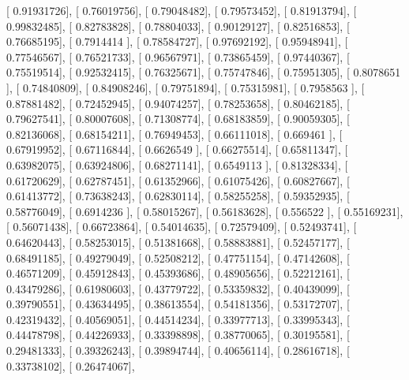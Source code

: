 \documentclass{article}
\begin{document}
       [ 0.91931726],
       [ 0.76019756],
       [ 0.79048482],
       [ 0.79573452],
       [ 0.81913794],
       [ 0.99832485],
       [ 0.82783828],
       [ 0.78804033],
       [ 0.90129127],
       [ 0.82516853],
       [ 0.76685195],
       [ 0.7914414 ],
       [ 0.78584727],
       [ 0.97692192],
       [ 0.95948941],
       [ 0.77546567],
       [ 0.76521733],
       [ 0.96567971],
       [ 0.73865459],
       [ 0.97440367],
       [ 0.75519514],
       [ 0.92532415],
       [ 0.76325671],
       [ 0.75747846],
       [ 0.75951305],
       [ 0.8078651 ],
       [ 0.74840809],
       [ 0.84908246],
       [ 0.79751894],
       [ 0.75315981],
       [ 0.7958563 ],
       [ 0.87881482],
       [ 0.72452945],
       [ 0.94074257],
       [ 0.78253658],
       [ 0.80462185],
       [ 0.79627541],
       [ 0.80007608],
       [ 0.71308774],
       [ 0.68183859],
       [ 0.90059305],
       [ 0.82136068],
       [ 0.68154211],
       [ 0.76949453],
       [ 0.66111018],
       [ 0.669461  ],
       [ 0.67919952],
       [ 0.67116844],
       [ 0.6626549 ],
       [ 0.66275514],
       [ 0.65811347],
       [ 0.63982075],
       [ 0.63924806],
       [ 0.68271141],
       [ 0.6549113 ],
       [ 0.81328334],
       [ 0.61720629],
       [ 0.62787451],
       [ 0.61352966],
       [ 0.61075426],
       [ 0.60827667],
       [ 0.61413772],
       [ 0.73638243],
       [ 0.62830114],
       [ 0.58255258],
       [ 0.59352935],
       [ 0.58776049],
       [ 0.6914236 ],
       [ 0.58015267],
       [ 0.56183628],
       [ 0.556522  ],
       [ 0.55169231],
       [ 0.56071438],
       [ 0.66723864],
       [ 0.54014635],
       [ 0.72579409],
       [ 0.52493741],
       [ 0.64620443],
       [ 0.58253015],
       [ 0.51381668],
       [ 0.58883881],
       [ 0.52457177],
       [ 0.68491185],
       [ 0.49279049],
       [ 0.52508212],
       [ 0.47751154],
       [ 0.47142608],
       [ 0.46571209],
       [ 0.45912843],
       [ 0.45393686],
       [ 0.48905656],
       [ 0.52212161],
       [ 0.43479286],
       [ 0.61980603],
       [ 0.43779722],
       [ 0.53359832],
       [ 0.40439099],
       [ 0.39790551],
       [ 0.43634495],
       [ 0.38613554],
       [ 0.54181356],
       [ 0.53172707],
       [ 0.42319432],
       [ 0.40569051],
       [ 0.44514234],
       [ 0.33977713],
       [ 0.33995343],
       [ 0.44478798],
       [ 0.44226933],
       [ 0.33398898],
       [ 0.38770065],
       [ 0.30195581],
       [ 0.29481333],
       [ 0.39326243],
       [ 0.39894744],
       [ 0.40656114],
       [ 0.28616718],
       [ 0.33738102],
       [ 0.26474067],
\end{document}
